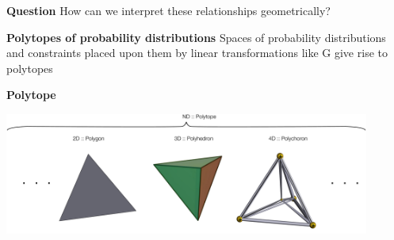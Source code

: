 \begin{frame}
\begin{block}{\textbf{Question}}
How can we interpret these relationships geometrically?
\end{block}
\begin{block}{\textbf{Polytopes of probability distributions}}
Spaces of probability distributions and constraints placed upon them by linear transformations like G give rise to polytopes
\end{block}
\begin{block}{\textbf{Polytope}}
\begin{center}
\includegraphics[width=0.9\textwidth]{fig/polytope.pdf}
\end{center}
\end{block}
\end{frame}

